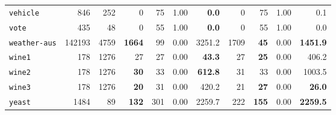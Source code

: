 \begin{tabular}{lccrrrrrrrr}
\texttt{vehicle} & \multicolumn{1}{r}{846} & \multicolumn{1}{r}{252}  & 0 & 75 & 1.00 & \textbf{0.0} & 0 & 75 & 1.00 & 0.1\\
\texttt{vote} & \multicolumn{1}{r}{435} & \multicolumn{1}{r}{48}  & 0 & 55 & 1.00 & \textbf{0.0} & 0 & 55 & 1.00 & 0.0\\
\texttt{weather-aus} & \multicolumn{1}{r}{142193} & \multicolumn{1}{r}{4759}  & \textbf{1664} & 99 & 0.00 & 3251.2 & 1709 & \textbf{45} & 0.00 & \textbf{1451.9}\\
\texttt{wine1} & \multicolumn{1}{r}{178} & \multicolumn{1}{r}{1276}  & 27 & 27 & 0.00 & \textbf{43.3} & 27 & \textbf{25} & 0.00 & 406.2\\
\texttt{wine2} & \multicolumn{1}{r}{178} & \multicolumn{1}{r}{1276}  & \textbf{30} & 33 & 0.00 & \textbf{612.8} & 31 & 33 & 0.00 & 1003.5\\
\texttt{wine3} & \multicolumn{1}{r}{178} & \multicolumn{1}{r}{1276}  & \textbf{20} & 31 & 0.00 & 420.2 & 21 & \textbf{27} & 0.00 & \textbf{26.0}\\
\texttt{yeast} & \multicolumn{1}{r}{1484} & \multicolumn{1}{r}{89}  & \textbf{132} & 301 & 0.00 & 2259.7 & 222 & \textbf{155} & 0.00 & \textbf{2259.5}\\
\bottomrule
\end{tabular}
